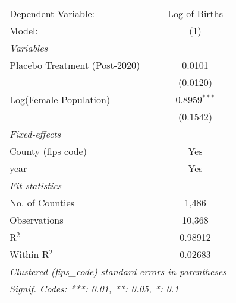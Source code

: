 \begingroup
\centering
\begin{tabular}{lc}
   \tabularnewline \midrule \midrule
   Dependent Variable:           & Log of Births\\   
   Model:                        & (1)\\  
   \midrule
   \emph{Variables}\\
   Placebo Treatment (Post-2020) & 0.0101\\   
                                 & (0.0120)\\   
   Log(Female Population)        & 0.8959$^{***}$\\   
                                 & (0.1542)\\   
   \midrule
   \emph{Fixed-effects}\\
   County (fips code)            & Yes\\  
   year                          & Yes\\  
   \midrule
   \emph{Fit statistics}\\
   No. of Counties               & 1,486\\
   Observations                  & 10,368\\  
   R$^2$                         & 0.98912\\  
   Within R$^2$                  & 0.02683\\  
   \midrule \midrule
   \multicolumn{2}{l}{\emph{Clustered (fips\_code) standard-errors in parentheses}}\\
   \multicolumn{2}{l}{\emph{Signif. Codes: ***: 0.01, **: 0.05, *: 0.1}}\\
\end{tabular}
\par\endgroup